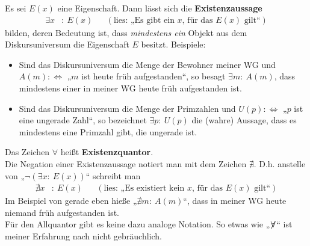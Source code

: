 \begin{de}[Existenzaussage]
  Es sei $E(x)$ eine Eigenschaft. Dann lässt sich die \textbf{Existenzaussage}
 \begin{align*}
    \exists x&:\ E(x) && (\text{lies: „Es gibt ein $x$, für das $E(x)$ gilt“})
 \end{align*}
bilden, deren Bedeutung ist, dass \emph{mindestens ein} Objekt aus dem Diskursuniversum die Eigenschaft $E$ besitzt. Beispiele:
\begin{itemize}
 \item Sind das Diskursuniversum die Menge der Bewohner meiner WG und $A(m):\Leftrightarrow$ „$m$ ist heute früh aufgestanden“, so besagt $\exists m:\ A(m)$, dass mindestens einer in meiner WG heute früh aufgestanden ist.
 \item Sind das Diskursuniversum die Menge der Primzahlen und $U(p):\Leftrightarrow$ „$p$ ist eine ungerade Zahl“, so bezeichnet $\exists p:\ U(p)$ die (wahre) Aussage, dass es mindestens eine Primzahl gibt, die ungerade ist.
\end{itemize}
Das Zeichen $\forall$ heißt \textbf{Existenzquantor}. \\[0.5em]
Die Negation einer Existenzaussage notiert man mit dem Zeichen $\nexists$. D.h. anstelle von „$\neg (\exists x:\ E(x))$“ schreibt man
\begin{align*}
  \nexists x&:\ E(x) && (\text{lies: „Es existiert kein $x$, für das $E(x)$ gilt“})
 \end{align*}
 Im Beispiel von gerade eben hieße „$\nexists m:\ A(m)$“, dass in meiner WG heute niemand früh aufgestanden ist. \\[0.5em]
 Für den Allquantor gibt es keine dazu analoge Notation. So etwas wie „$\not\kern-0.15em \forall$“ ist meiner Erfahrung nach nicht gebräuchlich.
\end{de}





